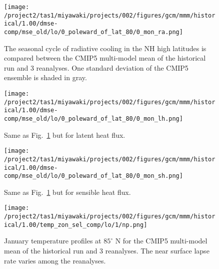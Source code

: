 \documentclass{article}
\begin{document}
\begin{figure}
    \texttt{[image: /project2/tas1/miyawaki/projects/002/figures/gcm/mmm/historical/1.00/dmse-comp/mse\_old/lo/0\_poleward\_of\_lat\_80/0\_mon\_ra.png]}
    \caption{The seasonal cycle of radiative cooling in the NH high latitudes is compared between the CMIP5 multi-model mean of the historical run and 3 reanalyses. One standard deviation of the CMIP5 ensemble is shaded in gray.}
    \label{fig:ra-comp-ssn}
\end{figure}

\begin{figure}
    \texttt{[image: /project2/tas1/miyawaki/projects/002/figures/gcm/mmm/historical/1.00/dmse-comp/mse\_old/lo/0\_poleward\_of\_lat\_80/0\_mon\_lh.png]}
    \caption{Same as Fig.~\ref{fig:ra-comp-ssn} but for latent heat flux.}
    \label{fig:lh-comp-ssn}
\end{figure}

\begin{figure}
    \texttt{[image: /project2/tas1/miyawaki/projects/002/figures/gcm/mmm/historical/1.00/dmse-comp/mse\_old/lo/0\_poleward\_of\_lat\_80/0\_mon\_sh.png]}
    \caption{Same as Fig.~\ref{fig:ra-comp-ssn} but for sensible heat flux.}
    \label{fig:sh-comp-ssn}
\end{figure}

\begin{figure}
    \texttt{[image: /project2/tas1/miyawaki/projects/002/figures/gcm/mmm/historical/1.00/temp\_zon\_sel\_comp/lo/1/np.png]}
    \caption{January temperature profiles at $85^\circ$ N for the CMIP5 multi-model mean of the historical run and 3 reanalyses. The near surface lapse rate varies among the reanalyses.}
    \label{fig:np-jan}
\end{figure}



\end{document}
